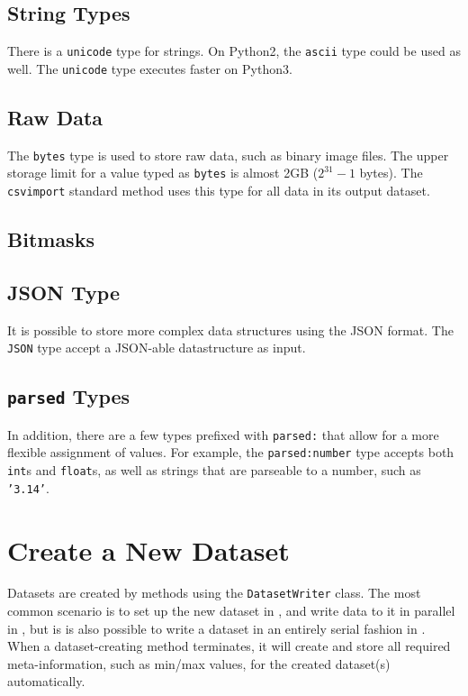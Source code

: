 \subsection{String Types}
There is a \texttt{unicode} type for strings.  On Python2, the
\texttt{ascii} type could be used as well.  The \texttt{unicode}
type executes faster on Python3.


\subsection{Raw Data}

The \texttt{bytes} type is used to store raw data, such as binary
image files.  The upper storage limit for a value typed
as \texttt{bytes} is almost 2GB ($2^{31}-1$ bytes).
The \texttt{csvimport} standard method uses this type for all data in
its output dataset.


\subsection{Bitmasks}


\subsection{JSON Type}
It is possible to store more complex data structures using the JSON
format.  The \texttt{JSON} type accept a JSON-able datastructure as
input.

\subsection{\texttt{parsed} Types}
In addition, there are a few types prefixed with \texttt{parsed:} that
allow for a more flexible assignment of values.  For example,
the \texttt{parsed:number} type accepts both \texttt{int}s
and \texttt{float}s, as well as strings that are parseable to a
number, such as \texttt{'3.14'}.



\section{Create a New Dataset}
Datasets are created by methods using the \texttt{DatasetWriter}
class.  The most common scenario is to set up the new dataset in
\prepare, and write data to it in parallel in \analysis, but is is
also possible to write a dataset in an entirely serial fashion in
\synthesis.  When a dataset-creating method terminates, it will create
and store all required meta-information, such as min/max values, for
the created dataset(s) automatically.

